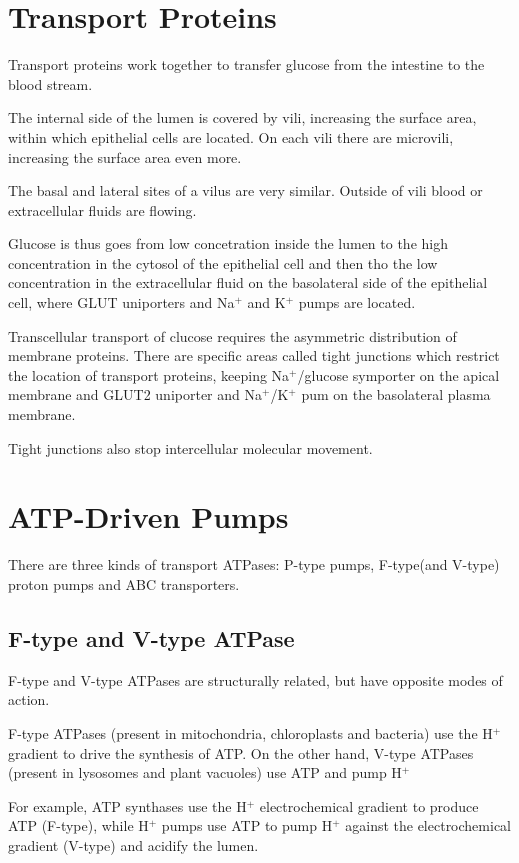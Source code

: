 \documentclass[11pt]{scrartcl}
\begin{document}
\section{Transport Proteins}

Transport proteins work together to transfer glucose from the
intestine to the blood stream.

The internal side of the lumen is covered by vili, increasing the
surface area, within which epithelial cells are located. On each vili
there are microvili, increasing the surface area even more.

The basal and lateral sites of a vilus are very similar. Outside of
vili blood or extracellular fluids are flowing.

Glucose is thus goes from low concetration inside the lumen to the
high concentration in the cytosol of the epithelial cell and then tho
the low concentration in the extracellular fluid on the basolateral
side of the epithelial cell, where GLUT uniporters and Na$^+$ and
K$^+$ pumps are located.

Transcellular transport of clucose requires the asymmetric
distribution of membrane proteins. There are specific areas called
tight junctions which restrict the location of transport proteins,
keeping Na$^+$/glucose symporter on the apical membrane and GLUT2
uniporter and Na$^+$/K$^+$ pum on the basolateral plasma membrane.

Tight junctions also stop intercellular molecular movement.

\section{ATP-Driven Pumps}

There are three kinds of transport ATPases: P-type pumps, F-type(and
V-type) proton pumps and ABC transporters.

\subsection{F-type and V-type ATPase}

F-type and V-type ATPases are structurally related, but have opposite
modes of action.

F-type ATPases (present in mitochondria, chloroplasts and bacteria)
use the H$^+$ gradient to drive the synthesis of ATP. On the other
hand, V-type ATPases (present in lysosomes and plant vacuoles) use ATP and pump H$^+$

For example, ATP synthases use the H$^+$ electrochemical gradient to
produce ATP (F-type), while H$^+$ pumps use ATP to pump H$^+$ against
the electrochemical gradient (V-type) and acidify the lumen.
\end{document}
